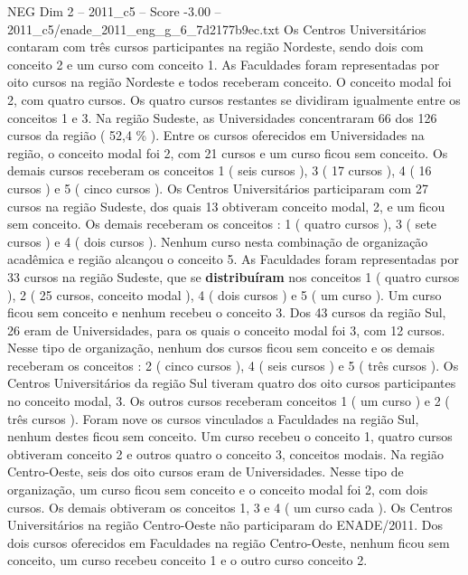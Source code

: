 \begin{textsample}{NEG Dim 2 – 2011\_c5 – Score -3.00 – 2011\_c5/enade\_2011\_eng\_g\_6\_7d2177b9ec.txt}
Os Centros Universitários contaram com três cursos participantes na região Nordeste, sendo dois com conceito 2 e um curso com conceito 1.
As Faculdades foram representadas por oito cursos na região Nordeste e todos receberam conceito.
O conceito modal foi 2, com quatro cursos.
Os quatro cursos restantes se dividiram igualmente entre os conceitos 1 e 3.
Na região Sudeste, as Universidades concentraram 66 dos 126 cursos da região ( 52,4 \% ).
Entre os cursos oferecidos em Universidades na região, o conceito modal foi 2, com 21 cursos e um curso ficou sem conceito.
Os demais cursos receberam os conceitos 1 ( seis cursos ), 3 ( 17 cursos ), 4 ( 16 cursos ) e 5 ( cinco cursos ).
Os Centros Universitários participaram com 27 cursos na região Sudeste, dos quais 13 obtiveram conceito modal, 2, e um ficou sem conceito.
Os demais receberam os conceitos : 1 ( quatro cursos ), 3 ( sete cursos ) e 4 ( dois cursos ).
Nenhum curso nesta combinação de organização acadêmica e região alcançou o conceito 5.
As Faculdades foram representadas por 33 cursos na região Sudeste, que se \textbf{distribuíram} nos conceitos 1 ( quatro cursos ), 2 ( 25 cursos, conceito modal ), 4 ( dois cursos ) e 5 ( um curso ).
Um curso ficou sem conceito e nenhum recebeu o conceito 3.
Dos 43 cursos da região Sul, 26 eram de Universidades, para os quais o conceito modal foi 3, com 12 cursos.
Nesse tipo de organização, nenhum dos cursos ficou sem conceito e os demais receberam os conceitos : 2 ( cinco cursos ), 4 ( seis cursos ) e 5 ( três cursos ).
Os Centros Universitários da região Sul tiveram quatro dos oito cursos participantes no conceito modal, 3.
Os outros cursos receberam conceitos 1 ( um curso ) e 2 ( três cursos ).
Foram nove os cursos vinculados a Faculdades na região Sul, nenhum destes ficou sem conceito.
Um curso recebeu o conceito 1, quatro cursos obtiveram conceito 2 e outros quatro o conceito 3, conceitos modais.
Na região Centro-Oeste, seis dos oito cursos eram de Universidades.
Nesse tipo de organização, um curso ficou sem conceito e o conceito modal foi 2, com dois cursos.
Os demais obtiveram os conceitos 1, 3 e 4 ( um curso cada ).
Os Centros Universitários na região Centro-Oeste não participaram do ENADE/2011.
Dos dois cursos oferecidos em Faculdades na região Centro-Oeste, nenhum ficou sem conceito, um curso recebeu conceito 1 e o outro curso conceito 2.

\end{textsample}
